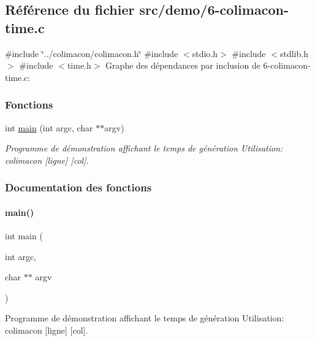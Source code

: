 \hypertarget{6-colimacon-time_8c}{}\subsection{Référence du fichier src/demo/6-\/colimacon-\/time.c}
\label{6-colimacon-time_8c}
{\ttfamily \#include \char`\"{}../colimacon/colimacon.\+h\char`\"{}}\newline
{\ttfamily \#include $<$stdio.\+h$>$}\newline
{\ttfamily \#include $<$stdlib.\+h$>$}\newline
{\ttfamily \#include $<$time.\+h$>$}\newline
Graphe des dépendances par inclusion de 6-\/colimacon-\/time.c\+:
\subsubsection*{Fonctions}
\begin{DoxyCompactItemize}
\item 
int \hyperlink{6-colimacon-time_8c_a3c04138a5bfe5d72780bb7e82a18e627}{main} (int argc, char $\ast$$\ast$argv)
\begin{DoxyCompactList}\small\item\em Programme de démonstration affichant le temps de génération Utilisation\+: colimacon \mbox{[}ligne\mbox{]} \mbox{[}col\mbox{]}. \end{DoxyCompactList}\end{DoxyCompactItemize}


\subsubsection{Documentation des fonctions}
\mbox{\label{6-colimacon-time_8c_a3c04138a5bfe5d72780bb7e82a18e627}} 
\paragraph{\texorpdfstring{main()}{main()}}
{\footnotesize\ttfamily int main (\begin{DoxyParamCaption}\item[{int}]{argc,  }\item[{char $\ast$$\ast$}]{argv }\end{DoxyParamCaption})}



Programme de démonstration affichant le temps de génération Utilisation\+: colimacon \mbox{[}ligne\mbox{]} \mbox{[}col\mbox{]}. 

